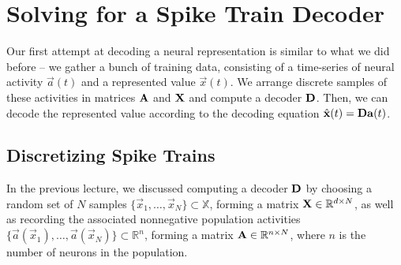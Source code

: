 \documentclass[10pt,letterpaper,oneside]{article}
\begin{document}
\section{Solving for a Spike Train Decoder}

Our first attempt at decoding a neural representation is similar to what we did before -- we gather a bunch of training data, consisting of a time-series of neural activity $\vec a(t)$ and a represented value $\vec x(t)$. We arrange discrete samples of these activities in matrices ${\mathbf{A}}$ and ${\mathbf{X}}$ and compute a decoder ${\mathbf{D}}$. Then, we can decode the represented value according to the decoding equation $\hat{{\mathbf{x}}}(t) = {\mathbf{D}} {\mathbf{a}}(t)$.


\subsection{Discretizing Spike Trains}

In the previous lecture, we discussed computing a decoder ${\mathbf{D}}$ by choosing a random set of $N$ samples $\big\{ \vec x_1, \ldots, \vec x_N \big\} \subset \mathbb{X}$, forming a matrix ${\mathbf{X}} \in \mathbb{R}^{d \times N}$, as well as recording the associated nonnegative population activities $\big\{ \vec a(\vec x_1), \ldots, \vec a(\vec x_N) \big\} \subset \mathbb{R}^n$, forming a matrix ${\mathbf{A}} \in \mathbb{R}^{n \times N}$, where $n$ is the number of neurons in the population.
\end{document}
